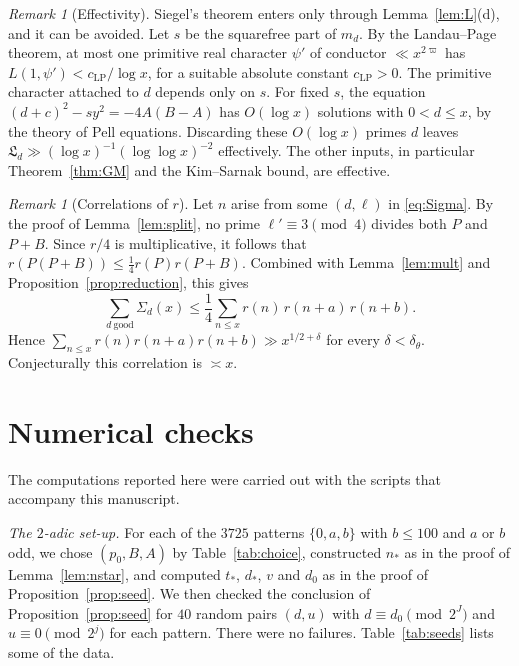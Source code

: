 \documentclass[11pt]{amsart}
\theoremstyle{remark}
\newtheorem{remark}[theorem]{Remark}
\theoremstyle{definition}
\numberwithin{equation}{section}
\newcommand{\Lf}{\mathfrak{L}}
\begin{document}
\begin{remark}[Effectivity]\label{rem:effective}
Siegel's theorem enters only through Lemma~\ref{lem:L}(d), and it can be avoided. Let $s$ be the squarefree part of $m_d$. By the Landau--Page theorem, at most one primitive real character $\psi'$ of conductor $\ll x^{2\varpi}$ has $L(1,\psi')<c_{\mathrm{LP}}/\log x$, for a suitable absolute constant $c_{\mathrm{LP}}>0$. The primitive character attached to $d$ depends only on $s$. For fixed $s$, the equation $(d+c)^2-sy^2=-4A(B-A)$ has $O(\log x)$ solutions with $0<d\le x$, by the theory of Pell equations. Discarding these $O(\log x)$ primes $d$ leaves $\Lf_d\gg(\log x)^{-1}(\log\log x)^{-2}$ effectively. The other inputs, in particular Theorem~\ref{thm:GM} and the Kim--Sarnak bound, are effective.
\end{remark}

\begin{remark}[Correlations of $r$]\label{rem:correlation}
Let $n$ arise from some $(d,\ell)$ in \eqref{eq:Sigma}. By the proof of Lemma~\ref{lem:split}, no prime $\ell'\equiv3\pmod4$ divides both $P$ and $P+B$. Since $r/4$ is multiplicative, it follows that $r(P(P+B))\le\frac14r(P)r(P+B)$. Combined with Lemma~\ref{lem:mult} and Proposition~\ref{prop:reduction}, this gives
\[
\sum_{d\ \mathrm{good}}\Sigma_d(x)\le\frac14\sum_{n\le x}r(n)\,r(n+a)\,r(n+b).
\]
Hence $\sum_{n\le x}r(n)r(n+a)r(n+b)\gg x^{1/2+\delta}$ for every $\delta<\delta_\theta$. Conjecturally this correlation is $\asymp x$.
\end{remark}

\section{Numerical checks}\label{sec:numerics}

The computations reported here were carried out with the scripts that accompany this manuscript.

\emph{The $2$-adic set-up.} For each of the $3725$ patterns $\{0,a,b\}$ with $b\le100$ and $a$ or $b$ odd, we chose $(p_0,B,A)$ by Table~\ref{tab:choice}, constructed $n_*$ as in the proof of Lemma~\ref{lem:nstar}, and computed $t_*$, $d_*$, $v$ and $d_0$ as in the proof of Proposition~\ref{prop:seed}. We then checked the conclusion of Proposition~\ref{prop:seed} for $40$ random pairs $(d,u)$ with $d\equiv d_0\pmod{2^J}$ and $u\equiv0\pmod{2^j}$ for each pattern. There were no failures. Table~\ref{tab:seeds} lists some of the data.
\end{document}
